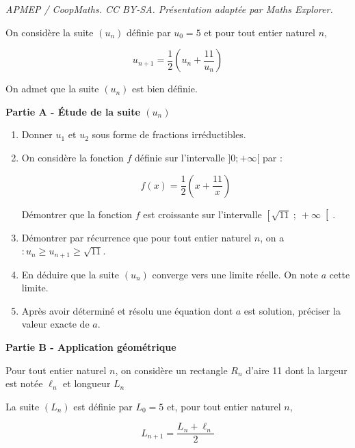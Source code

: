 \documentclass[10pt]{article}
\begin{document}
\noindent\textit{APMEP / CoopMaths. CC BY-SA. Présentation adaptée par Maths Explorer.}\par\medskip
\medskip

On considère la suite $\left(u_{n}\right)$ définie par $u_{0}=5$ et pour tout entier naturel $n$,

\[	u_{n+1}=\frac{1}{2}\left(u_{n}+\frac{11}{u_{n}}\right)\]

On admet que la suite $\left(u_{n}\right)$ est bien définie.

\medskip

\textbf{Partie A - Étude de la suite \boldmath$ \left(u_{n}\right)$}\unboldmath

\medskip

\begin{enumerate}
\item Donner $u_{1}$ et $u_{2}$ sous forme de fractions irréductibles.
\item On considère la fonction $f$ définie sur l'intervalle $]0 ; +\infty [$ par :

\[f(x)=\frac{1}{2}\left(x+\frac{11}{x}\right)\]

Démontrer que la fonction $f$ est croissante sur l'intervalle $\left[\sqrt{11}~;~+\infty\right[$.
\item Démontrer par récurrence que pour tout entier naturel $n$, on a $: u_{n} \geqslant u_{n+1} \geqslant \sqrt{11}$.
\item En déduire que la suite $\left(u_{n}\right)$ converge vers une limite réelle. On note $a$ cette limite.
\item Après avoir déterminé et résolu une équation dont $a$ est solution, préciser la valeur exacte de $a$.
\end{enumerate}

\medskip

\textbf{Partie B - Application géométrique}

\medskip

Pour tout entier naturel $n$, on considère un rectangle $R_{n}$ d'aire 11 dont la largeur est notée $\ell_{n}$ et longueur $L_{n}$

La suite $\left(L_{n}\right)$ est définie par $L_{0}=5$ et, pour tout entier naturel $n$,

\[L_{n+1}=\frac{L_{n}+\ell_{n}}{2} \]
\end{document}
